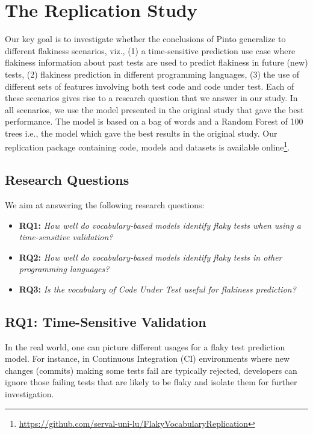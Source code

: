 \section{The Replication Study}
\label{sec:replication-replication}

Our key goal is to investigate whether the conclusions of Pinto \etal generalize to different flakiness scenarios, viz., (1) a time-sensitive prediction use case where flakiness information about past tests are used to predict flakiness in future (new) tests, (2) flakiness prediction in different programming languages, (3) the use of different sets of features involving both test code and code under test. Each of these scenarios gives rise to a research question that we answer in our study. In all scenarios, we use the model presented in the original study that gave the best performance. The model is based on a bag of words and a Random Forest of 100 trees i.e., the model which gave the best results in the original study. Our replication package containing code, models and datasets is available online\footnote{\url{https://github.com/serval-uni-lu/FlakyVocabularyReplication}}.

\subsection{Research Questions}
We aim at answering the following research questions:
\begin{itemize}[label={}]
\item \textbf{\textsc{RQ1:}} \emph{How  well  do  vocabulary-based  models  identify flaky  tests  when  using  a  time-sensitive validation?}
\item \textbf{\textsc{RQ2:}} \emph{How  well  do  vocabulary-based  models  identify flaky tests in other programming languages?}
\item \textbf{\textsc{RQ3:}} \emph{Is the vocabulary of Code Under Test useful for flakiness prediction?}
\end{itemize}

\subsection{RQ1: Time-Sensitive Validation}
In the real world, one can picture different usages for a flaky test prediction model. 
For instance, in Continuous Integration (CI) environments where new changes (commits) making some tests fail are typically rejected, developers can ignore those failing tests that are likely to be flaky and isolate them for further investigation.


